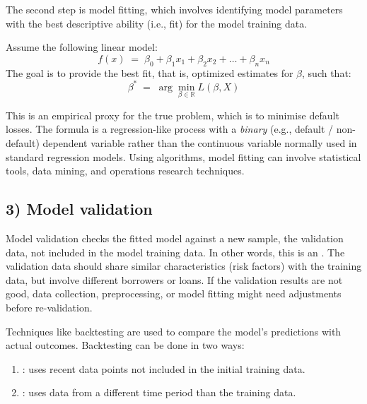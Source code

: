 The second step is model fitting, which involves identifying model parameters
with the best descriptive ability (i.e., fit) for the model training data.

\begin{crfmlbox}
Assume the following linear model:
\[ f(x) \;=\; \beta_0 + \beta_1 x_1 + \beta_2 x_2 + \dots + \beta_n x_n \]
The goal is to provide the best fit, that is, optimized estimates for $\beta$,
such that:
\[ \beta^{*} \;=\; \arg\min_{\beta \in \mathbb{R}} L(\beta, X) \]
\end{crfmlbox}

This is an empirical proxy for the true problem, which is to minimise default
losses. The formula is a regression-like process with a \emph{binary} (e.g.,
default / non-default) dependent variable rather than the continuous variable
normally used in standard regression models. Using algorithms, model fitting can
involve statistical tools, data mining, and operations research techniques.

\subsection*{3) Model validation}

Model validation checks the fitted model against a new sample, the validation
data, not included in the model training data. In other words, this is an
. The validation data should share similar
characteristics (risk factors) with the training data, but involve different
borrowers or loans. If the validation results are not good, data collection,
preprocessing, or model fitting might need adjustments before re-validation.

Techniques like backtesting are used to compare the model's predictions with
actual outcomes. Backtesting can be done in two ways:

\begin{enumerate}[label=\alph*)]
\item {}: uses recent data points not included in the initial
training data.
\item {}: uses data from a different time period than the
training data.
\end{enumerate}

